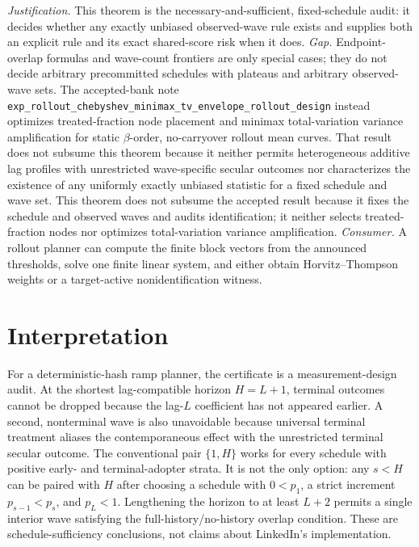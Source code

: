 \documentclass{article}
\begin{document}
\par\smallskip\noindent \textit{Justification.} This theorem is the necessary-and-sufficient, fixed-schedule audit: it decides whether any exactly unbiased observed-wave rule exists and supplies both an explicit rule and its exact shared-score risk when it does. \textit{Gap.} Endpoint-overlap formulas and wave-count frontiers are only special cases; they do not decide arbitrary precommitted schedules with plateaus and arbitrary observed-wave sets. The accepted-bank note \texttt{exp\_rollout\_chebyshev\_minimax\_tv\_envelope\_rollout\_design} instead optimizes treated-fraction node placement and minimax total-variation variance amplification for static \(\beta\)-order, no-carryover rollout mean curves. That result does not subsume this theorem because it neither permits heterogeneous additive lag profiles with unrestricted wave-specific secular outcomes nor characterizes the existence of any uniformly exactly unbiased statistic for a fixed schedule and wave set. This theorem does not subsume the accepted result because it fixes the schedule and observed waves and audits identification; it neither selects treated-fraction nodes nor optimizes total-variation variance amplification. \textit{Consumer.} A rollout planner can compute the finite block vectors from the announced thresholds, solve one finite linear system, and either obtain Horvitz--Thompson weights or a target-active nonidentification witness.

\section{Interpretation}

For a deterministic-hash ramp planner, the certificate is a measurement-design audit. At the shortest lag-compatible horizon \(H=L+1\), terminal outcomes cannot be dropped because the lag-\(L\) coefficient has not appeared earlier. A second, nonterminal wave is also unavoidable because universal terminal treatment aliases the contemporaneous effect with the unrestricted terminal secular outcome. The conventional pair \(\{1,H\}\) works for every schedule with positive early- and terminal-adopter strata. It is not the only option: any \(s<H\) can be paired with \(H\) after choosing a schedule with \(0<p_1\), a strict increment \(p_{s-1}<p_s\), and \(p_L<1\). Lengthening the horizon to at least \(L+2\) permits a single interior wave satisfying the full-history/no-history overlap condition. These are schedule-sufficiency conclusions, not claims about LinkedIn's implementation.
\end{document}
